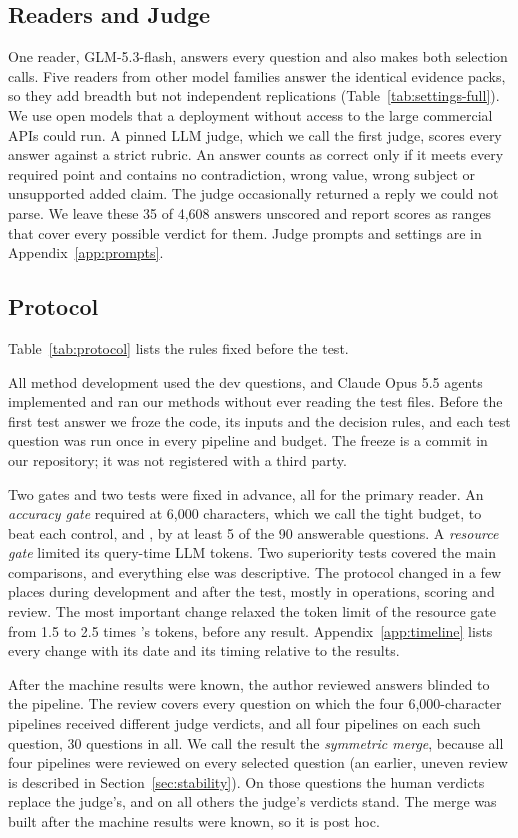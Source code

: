 \subsection{Readers and Judge}
\label{sec:readers}
One reader, GLM-5.3-flash, answers every question and also makes both selection calls. Five readers from other model families answer the identical evidence packs, so they add breadth but not independent replications (Table~\ref{tab:settings-full}). We use open models that a deployment without access to the large commercial APIs could run. A pinned LLM judge, which we call the first judge, scores every answer against a strict rubric. An answer counts as correct only if it meets every required point and contains no contradiction, wrong value, wrong subject or unsupported added claim. The judge occasionally returned a reply we could not parse. We leave these 35 of 4,608 answers unscored and report scores as ranges that cover every possible verdict for them. Judge prompts and settings are in Appendix~\ref{app:prompts}.

\subsection{Protocol}
\label{sec:protocol}
Table~\ref{tab:protocol} lists the rules fixed before the test.

All method development used the dev questions, and Claude Opus 5.5 agents implemented and ran our methods without ever reading the test files. Before the first test answer we froze the code, its inputs and the decision rules, and each test question was run once in every pipeline and budget. The freeze is a commit in our repository; it was not registered with a third party.

Two gates and two tests were fixed in advance, all for the primary reader. An \emph{accuracy gate} required \lexb{} at 6,000 characters, which we call the tight budget, to beat each control, \hybrid{} and \hr, by at least 5 of the 90 answerable questions. A \emph{resource gate} limited its query-time LLM tokens. Two superiority tests covered the main comparisons, and everything else was descriptive. The protocol changed in a few places during development and after the test, mostly in operations, scoring and review. The most important change relaxed the token limit of the resource gate from 1.5 to 2.5 times \hybrid's tokens, before any \lexb{} result. Appendix~\ref{app:timeline} lists every change with its date and its timing relative to the results.

After the machine results were known, the author reviewed answers blinded to the pipeline. The review covers every question on which the four 6,000-character pipelines received different judge verdicts, and all four pipelines on each such question, 30 questions in all. We call the result the \emph{symmetric merge}, because all four pipelines were reviewed on every selected question (an earlier, uneven review is described in Section~\ref{sec:stability}). On those questions the human verdicts replace the judge's, and on all others the judge's verdicts stand. The merge was built after the machine results were known, so it is post hoc.

